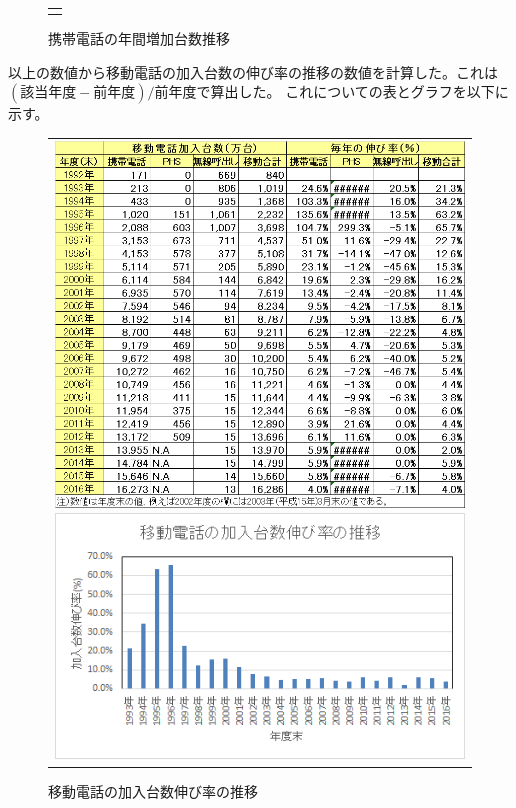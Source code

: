 \documentclass[uplatex, titlepage]{jsarticle}
\begin{document}
\begin{figure}[H]
\begin{tabular}{c}
\begin{minipage}{0.5\hsize}
\begin{center}
          \caption{携帯電話の年間増加台数推移}
          \label{fig:graphicx2}
        \end{center}
      \end{minipage}
    \end{tabular}
\end{figure}


以上の数値から移動電話の加入台数の伸び率の推移の数値を計算した。これは$(該当年度-前年度)/前年度$で算出した。
これについての表とグラフを以下に示す。


\begin{figure}[H]
  \centering
    \begin{tabular}{c}
      \begin{minipage}{0.5\hsize}
        \centering
          \includegraphics[scale = 0.5]{re2/f5.png}
          \caption{加入台数年度別伸び率}
        \label{fig:table3}
      \end{minipage}
      \begin{minipage}{0.5\hsize}
        \centering
          \includegraphics[scale = 0.9]{re2/f6.png}
          \caption{移動電話の加入台数伸び率の推移}
        \label{fig:graphicx3}
      \end{minipage}
  \end{tabular}
\end{figure}
\end{document}
